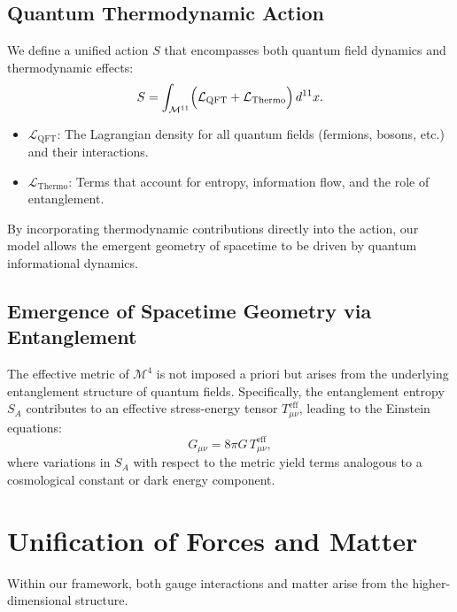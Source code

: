\documentclass[12pt, a4paper]{article}
\begin{document}
\subsection{Quantum Thermodynamic Action}
We define a unified action \(S\) that encompasses both quantum field dynamics and thermodynamic effects:
\begin{equation}
    S = \int_{\mathcal{M}^{11}} \Bigl( \mathcal{L}_{\text{QFT}} + \mathcal{L}_{\text{Thermo}} \Bigr) \, d^{11}x.
\end{equation}
\begin{itemize}
    \item \(\mathcal{L}_{\text{QFT}}\): The Lagrangian density for all quantum fields (fermions, bosons, etc.) and their interactions.
    \item \(\mathcal{L}_{\text{Thermo}}\): Terms that account for entropy, information flow, and the role of entanglement.
\end{itemize}
By incorporating thermodynamic contributions directly into the action, our model allows the emergent geometry of spacetime to be driven by quantum informational dynamics.

\subsection{Emergence of Spacetime Geometry via Entanglement}
The effective metric of \(\mathcal{M}^4\) is not imposed a priori but arises from the underlying entanglement structure of quantum fields. Specifically, the entanglement entropy \(S_A\) contributes to an effective stress-energy tensor \(T_{\mu\nu}^{\text{eff}}\), leading to the Einstein equations:
\begin{equation}
    G_{\mu\nu} = 8\pi G\, T_{\mu\nu}^{\text{eff}},
\end{equation}
where variations in \(S_A\) with respect to the metric yield terms analogous to a cosmological constant or dark energy component.

\section{Unification of Forces and Matter}
Within our framework, both gauge interactions and matter arise from the higher-dimensional structure.
\end{document}
